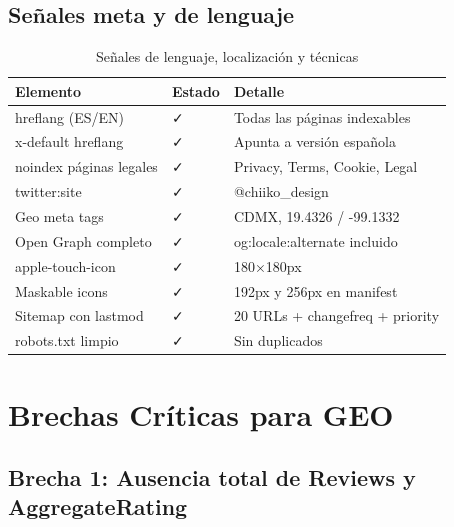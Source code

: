 \documentclass[12pt, a4paper]{article}
\begin{document}
\subsection{Señales meta y de lenguaje}

\begin{table}[H]
\centering
{}
\begin{tabularx}{\textwidth}{L{4.5cm} C{2cm} L{6cm}}
  \toprule
  \textbf{Elemento} & \textbf{Estado} & \textbf{Detalle} \\
  \midrule
  hreflang (ES/EN) & \textcolor{verde}{\faCheck} & Todas las páginas indexables \\
  x-default hreflang & \textcolor{verde}{\faCheck} & Apunta a versión española \\
  noindex páginas legales & \textcolor{verde}{\faCheck} & Privacy, Terms, Cookie, Legal \\
  twitter:site & \textcolor{verde}{\faCheck} & @chiiko\_design \\
  Geo meta tags & \textcolor{verde}{\faCheck} & CDMX, 19.4326 / -99.1332 \\
  Open Graph completo & \textcolor{verde}{\faCheck} & og:locale:alternate incluido \\
  apple-touch-icon & \textcolor{verde}{\faCheck} & 180×180px \\
  Maskable icons & \textcolor{verde}{\faCheck} & 192px y 256px en manifest \\
  Sitemap con lastmod & \textcolor{verde}{\faCheck} & 20 URLs + changefreq + priority \\
  robots.txt limpio & \textcolor{verde}{\faCheck} & Sin duplicados \\
  \bottomrule
\end{tabularx}
\caption{Señales de lenguaje, localización y técnicas}
\end{table}

\newpage

\section{Brechas Críticas para GEO}

\subsection{Brecha 1: Ausencia total de Reviews y AggregateRating}
\end{document}
